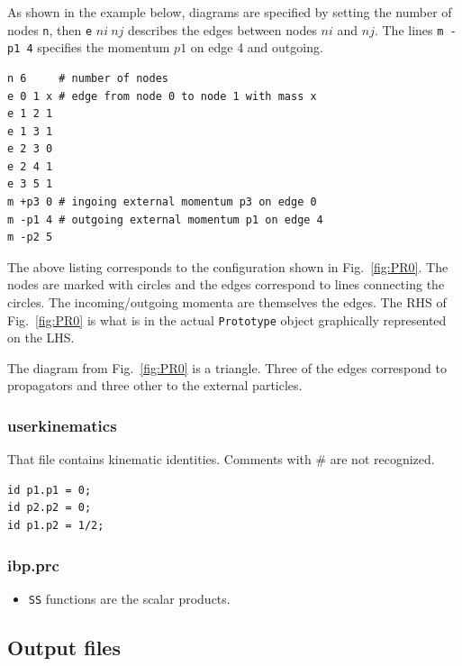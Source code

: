 \documentclass[a4paper,11pt]{article}
\begin{document}
As shown in the example below, diagrams are specified by setting the number of
nodes \verb+n+, then \verb+e+ $ni\ nj$ describes the edges between nodes $ni$
and $nj$.
%
The lines \verb+m -p1 4+  specifies the momentum $p1$ on edge 4 and outgoing.


\begin{lstlisting}[label=test-proto, caption=proto]
n 6     # number of nodes
e 0 1 x # edge from node 0 to node 1 with mass x
e 1 2 1
e 1 3 1
e 2 3 0
e 2 4 1
e 3 5 1
m +p3 0 # ingoing external momentum p3 on edge 0
m -p1 4 # outgoing external momentum p1 on edge 4
m -p2 5
\end{lstlisting}

The above listing corresponds to the configuration shown in Fig.~\ref{fig:PR0}.
The nodes are marked with circles and the edges correspond to lines connecting
the circles. The incoming/outgoing momenta are themselves the edges. The RHS of 
Fig.~\ref{fig:PR0} is what is in the actual \verb+Prototype+ object graphically
represented on the LHS.

The diagram from Fig.~\ref{fig:PR0} is a triangle. Three of the edges
correspond to propagators and three other to the external particles.

\subsubsection*{userkinematics}

That file contains kinematic identities. Comments with \# are not recognized.

\begin{lstlisting}[label=test-userkinematics, caption=userkinematics]
id p1.p1 = 0;
id p2.p2 = 0;
id p1.p2 = 1/2;
\end{lstlisting}

\subsubsection*{ibp.prc}

\begin{itemize}
  \item
  \verb+SS+ functions are the scalar products.
\end{itemize}

\subsection{Output files}
\end{document}
